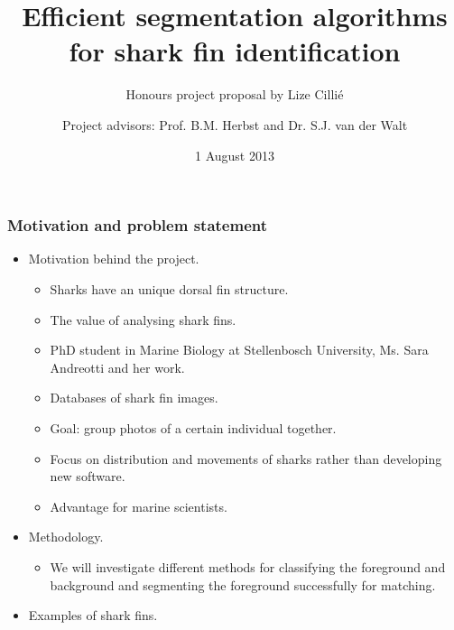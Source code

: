 \documentclass{beamer}
\title{Efficient segmentation algorithms for shark fin identification}
\subtitle{Honours project proposal by Lize Cilli\'{e}}
\author{Project advisors: Prof. B.M.
Herbst and Dr. S.J. van der Walt}
\date{1 August 2013}
\institute{Division of Applied Mathematics, Stellenbosch University}
\newcommand{\myitem}{\item[$-$]}
\begin{document}
\maketitle


\begin{frame}
\frametitle{Motivation and problem statement}
\begin{itemize}

\item Motivation behind the project.
\begin{itemize}
\myitem Sharks have an unique dorsal fin structure.
\myitem The value of analysing shark fins.
\myitem PhD student in Marine Biology at Stellenbosch University, Ms. Sara
Andreotti and her work.
\myitem Databases of shark fin images.
\myitem Goal: group photos of a certain individual together.
\myitem Focus on distribution and movements of sharks rather than developing new software.
\myitem Advantage for marine scientists.
\end{itemize}
\pause
\item Methodology.
\begin{itemize}
 \myitem We will investigate different methods for classifying the foreground and
background and segmenting the foreground successfully for matching. 
\end{itemize}
\pause
\item Examples of shark fins.
\end{itemize}
\end{frame}
\end{document}
